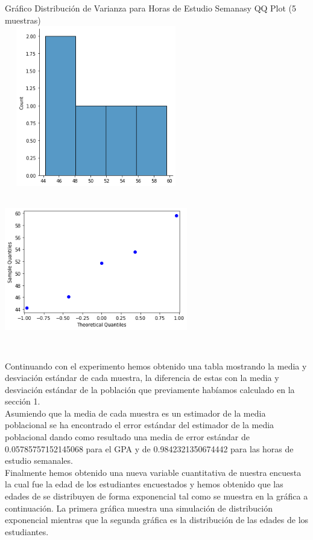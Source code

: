 \documentclass[12pt]{article}
\begin{document}
Gráfico Distribución de Varianza para Horas de Estudio Semanasy QQ Plot (5 muestras)\\
\includegraphics[width=8cm, height=7cm]{horas_histo2.5}
\includegraphics[width=8cm, height=7cm]{horas_qq2.5}

Continuando con el experimento hemos obtenido una tabla mostrando la media y desviación estándar de cada muestra, la diferencia de estas con la media y desviación estándar de la población que previamente habíamos calculado en la sección 1. \\

Asumiendo que la media de cada muestra es un estimador de la media poblacional se ha encontrado el error estándar del estimador de la media poblacional dando como resultado una media de error estándar de 0.05785757152145068 para el GPA y de 0.9842321350674442
para las horas de estudio semanales.\\

Finalmente hemos obtenido una nueva variable cuantitativa de nuestra encuesta la cual fue la edad de los estudiantes encuestados y hemos obtenido que las edades de se distribuyen de forma exponencial tal como se muestra en la gráfica a continuación. La primera gráfica muestra una simulación de distribución exponencial mientras que la segunda gráfica es la distribución de las edades de los estudiantes.\\
\end{document}
